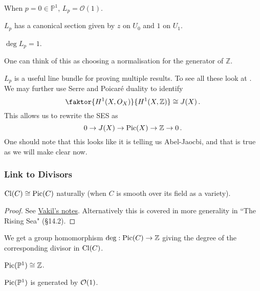 \documentclass{article}
\begin{document}
\begin{example}
	When $p =0 \in \mathbb{P}^1$, $L_p = \mathcal{O}(1)$. 
\end{example}

\begin{lemma}
	$L_p$ has a canonical section given by $z$ on $U_0$ and $1$ on $U_1$. 
\end{lemma}

\begin{prop}
	$\deg L_p = 1$. 
\end{prop}
\begin{remark}
	One can think of this as choosing a normalisation for the generator of $\mathbb{Z}$. 
\end{remark}
$L_p$ is a useful line bundle for proving multiple results. To see all these look at \cite{Hitchin2013}. \\
We may further use Serre and Poicar\'e duality to identify 
\[
\faktor{H^1(X,O_X)}{H^1(X,\mathbb{Z})} \cong J(X) \, .
\]
This allows us to rewrite the SES as 
\[
0 \to J(X) \to \operatorname{Pic}(X) \to \mathbb{Z} \to 0 \, .
\]
One should note that this looks like it is telling us Abel-Jaocbi, and that is true as we will make clear now.

 
\subsubsection{Link to Divisors}

\begin{theorem}
	$\operatorname{Cl}(C) \cong \operatorname{Pic}(C)$ naturally (when $C$ is smooth over its field as a variety). 
\end{theorem}
\begin{proof}
	See \href{https://math.stanford.edu/~vakil/725/class23.pdf}{Vakil's notes}. Alternatively this is covered in more generality in ``The Rising Sea" \cite{Vakil2010} (\S 14.2).
\end{proof}

\begin{corollary}
	We get a group homomorphism $\deg:\operatorname{Pic}(C) \to \mathbb{Z}$ giving the degree of the corresponding divisor in $\operatorname{Cl}(C)$. 
\end{corollary}

\begin{corollary}
	$\operatorname{Pic}(\mathbb{P}^1) \cong \mathbb{Z}$. 
\end{corollary}
\begin{prop}
	$\operatorname{Pic}(\mathbb{P}^1)$ is generated by $\mathcal{O}(1)$.  
\end{prop}
\end{document}
